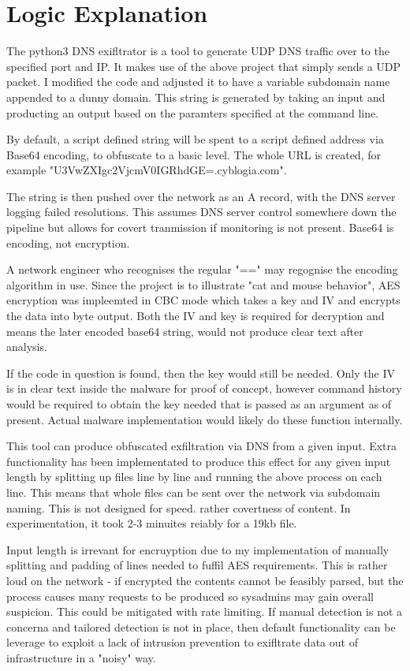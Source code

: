 \section{Logic Explanation}
The python3 DNS exifltrator is a tool to generate UDP DNS traffic over to the specified port and IP. It makes use of the above project that simply sends a UDP packet. I modified the code and adjusted it to have a variable subdomain name appended to a dunny domain.
This string is generated by taking an input and producting an output based on the paramters specified at the command line. 

By default, a script defined string will be spent to a script defined address via Base64 encoding, to obfuscate to a basic level. The whole URL is created,
for example "U3VwZXIgc2VjcmV0IGRhdGE=.cyblogia.com". 

The string is then pushed over the network as an A record, with the DNS server logging failed resolutions. This assumes DNS server control somewhere down the pipeline but allows for covert tranmission if monitoring is not present.
Base64 is encoding, not encryption. 

A network engineer who recognises the regular "==" may regognise the encoding algorithm in use. Since the project is to illustrate "cat and mouse behavior", AES encryption was impleemted in CBC mode which takes a key and IV and encrypts the data into byte output.
Both the IV and key is required for decryption and means the later encoded base64 string, would not produce clear text after analysis. 

If the code in question is found, then the key would still be needed. Only the IV is in clear text inside the malware for proof of concept, however command history would be required to obtain the key needed that is passed as an argument as of present. 
Actual malware implementation would likely do these function internally. 


This tool can produce obfuscated exfiltration via DNS from a given input. Extra functionality has been implementated to produce this effect for any given input length by splitting up files line by line and running the above process on each line. This means that whole files can be sent over the network via subdomain naming. This is not designed for speed. rather covertness of content. 
In experimentation, it took 2-3 minuites reiably for a 19kb file. 

Input length is irrevant for encruyption due to my implementation of manually splitting and padding of lines needed to fuffil AES requirements. This is rather loud on the network - if encrypted the contents cannot be feasibly parsed, but the process causes many requests to be produced so sysadmins may gain overall suspicion.
This could be mitigated with rate limiting. If manual detection is not a concerna and tailored detection is not in place, then default functionality can be leverage to exploit a lack of intrusion prevention to exifltrate data out of infrastructure in a "noisy" way.

